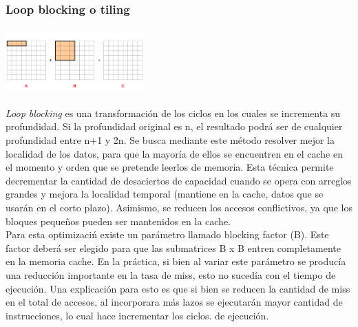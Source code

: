 \documentclass[a4paper,10pt]{article}
\begin{document}
\subsubsection*{Loop blocking o tiling}
\begin{center}
 \includegraphics[width=200px,height=95px,scale=1]{./blocking.png}
\end{center}

\textit{Loop blocking} es una transformaci\'on de los ciclos en los cuales se incrementa su profundidad. Si la profundidad original es n, el resultado podr\'a ser de cualquier profundidad entre n+1 y 2n. Se busca mediante este m\'etodo resolver mejor la localidad de los datos, para que la mayor\'ia de ellos se encuentren en el cache en el momento y orden que se pretende leerlos de memoria.
Esta t\'ecnica permite decrementar la cantidad de desaciertos de capacidad cuando se opera con arreglos grandes y mejora la localidad temporal (mantiene en la cache, datos que se usar\'an en el corto plazo). Asimismo, se reducen los accesos conflictivos, ya que los bloques
peque\~nos pueden ser mantenidos en la cache. \\
Para esta optimizaci\'n existe un par\'ametro llamado blocking factor (B). Este factor deber\'a ser elegido para que las submatrices B x B entren completamente en la memoria cache. 
En la pr\'actica, si bien al variar este par\'ametro se produc\'ia una reducci\'on importante en la tasa de miss, esto no suced\'ia con el tiempo de ejecuci\'on. Una explicaci\'on para esto
es que si bien se reducen la cantidad de miss en el total de accesos, al incorporara m\'as lazos se ejecutar\'an mayor cantidad de instrucciones, lo cual hace incrementar los ciclos. de ejecuci\'on.
\end{document}
